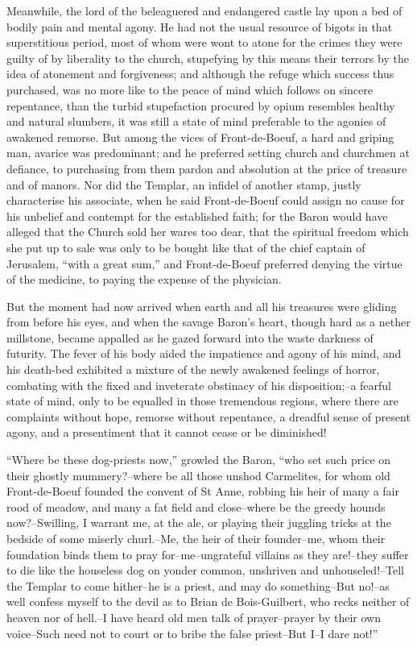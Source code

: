 Meanwhile, the lord of the beleaguered and endangered castle lay upon a
bed of bodily pain and mental agony. He had not the usual resource of
bigots in that superstitious period, most of whom were wont to atone for
the crimes they were guilty of by liberality to the church, stupefying
by this means their terrors by the idea of atonement and forgiveness;
and although the refuge which success thus purchased, was no more like
to the peace of mind which follows on sincere repentance, than the
turbid stupefaction procured by opium resembles healthy and natural
slumbers, it was still a state of mind preferable to the agonies of
awakened remorse. But among the vices of Front-de-Boeuf, a hard and
griping man, avarice was predominant; and he preferred setting church
and churchmen at defiance, to purchasing from them pardon and absolution
at the price of treasure and of manors. Nor did the Templar, an infidel
of another stamp, justly characterise his associate, when he said
Front-de-Boeuf could assign no cause for his unbelief and contempt for
the established faith; for the Baron would have alleged that the Church
sold her wares too dear, that the spiritual freedom which she put up to
sale was only to be bought like that of the chief captain of Jerusalem,
``with a great sum,'' and Front-de-Boeuf preferred denying the virtue of
the medicine, to paying the expense of the physician.

But the moment had now arrived when earth and all his treasures were
gliding from before his eyes, and when the savage Baron's heart, though
hard as a nether millstone, became appalled as he gazed forward into the
waste darkness of futurity. The fever of his body aided the impatience
and agony of his mind, and his death-bed exhibited a mixture of the
newly awakened feelings of horror, combating with the fixed and
inveterate obstinacy of his disposition;--a fearful state of mind, only
to be equalled in those tremendous regions, where there are complaints
without hope, remorse without repentance, a dreadful sense of present
agony, and a presentiment that it cannot cease or be diminished!

``Where be these dog-priests now,'' growled the Baron, ``who set such
price on their ghostly mummery?--where be all those unshod Carmelites,
for whom old Front-de-Boeuf founded the convent of St Anne, robbing his
heir of many a fair rood of meadow, and many a fat field and
close--where be the greedy hounds now?--Swilling, I warrant me, at the
ale, or playing their juggling tricks at the bedside of some miserly
churl.--Me, the heir of their founder--me, whom their foundation binds
them to pray for--me--ungrateful villains as they are!--they suffer to
die like the houseless dog on yonder common, unshriven and
unhouseled!--Tell the Templar to come hither--he is a priest, and may do
something--But no!--as well confess myself to the devil as to Brian de
Bois-Guilbert, who recks neither of heaven nor of hell.--I have heard
old men talk of prayer--prayer by their own voice--Such need not to
court or to bribe the false priest--But I--I dare not!''

